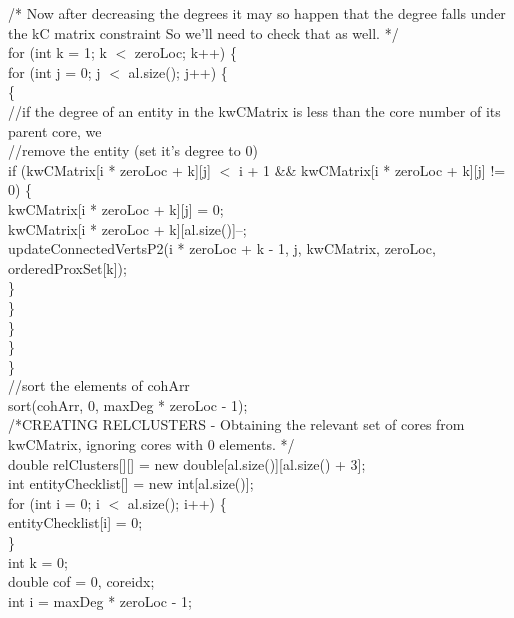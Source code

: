 \begin{ttfamily   }
\begin{scriptsize}
            \noindent /*
              Now after decreasing the degrees it may so happen that the degree falls under the kC  matrix constraint
              So we'll need to check that as well.
             */\\
            \noindent for (int k = 1;   k $<$ zeroLoc;   k++) \{\\
                \noindent for (int j = 0;   j $<$ al.size();   j++) \{\\
                    \{\\
                        \noindent//if the degree of an entity in the kwCMatrix is less than the core number of its parent core, we\\
                        \noindent//remove the entity (set it's degree to 0)\\
                        if (kwCMatrix[i * zeroLoc + k][j] $<$ i + 1
                                \&\& kwCMatrix[i * zeroLoc + k][j] != 0) \{\\
                            kwCMatrix[i * zeroLoc + k][j] = 0;\\
                            kwCMatrix[i * zeroLoc + k][al.size()]--;\\
                            updateConnectedVertsP2(i * zeroLoc + k - 1, j, kwCMatrix, zeroLoc, orderedProxSet[k]);\\
                        \}\\
                    \}\\
                \}\\
            \}\\
        \}\\

        \noindent//sort the elements of cohArr\\
        sort(cohArr, 0, maxDeg * zeroLoc - 1);\\

        \noindent /*CREATING RELCLUSTERS - Obtaining the relevant set of cores from kwCMatrix, ignoring cores with 0 elements. 
         */\\
        double relClusters[][] = new double[al.size()][al.size() + 3];\\
        int entityChecklist[] = new int[al.size()];\\
        \noindent for (int i = 0;   i $<$ al.size();   i++) \{\\
            entityChecklist[i] = 0;\\
        \}\\
        int k = 0;\\
        double cof = 0, coreidx;\\
        int i = maxDeg * zeroLoc - 1;\\


\end{scriptsize}
\end{ttfamily   }
